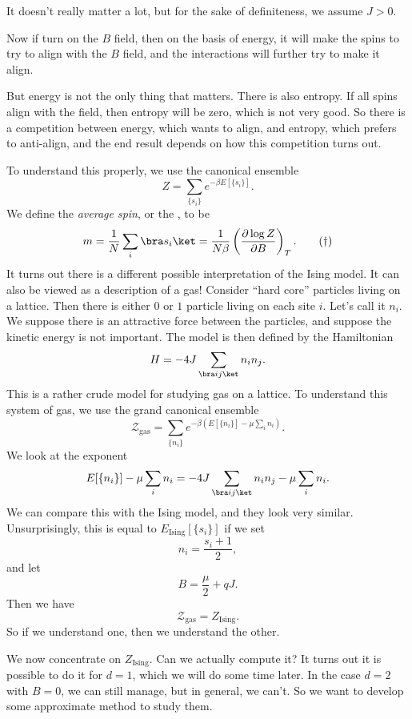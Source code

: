 \documentclass[a4paper]{article}
\begin{document}
It doesn't really matter a lot, but for the sake of definiteness, we assume $J > 0$.

Now if turn on the $B$ field, then on the basis of energy, it will make the spins to try to align with the $B$ field, and the interactions will further try to make it align.

But energy is not the only thing that matters. There is also entropy. If all spins align with the field, then entropy will be zero, which is not very good. So there is a competition between energy, which wants to align, and entropy, which prefers to anti-align, and the end result depends on how this competition turns out.

To understand this properly, we use the canonical ensemble
\[
  Z = \sum_{\{s_i\}} e^{-\beta E[\{s_i\}]}.
\]
We define the \emph{average spin}, or the , to be
\[
  m = \frac{1}{N} \sum_i \bra s_i\ket = \frac{1}{N\beta} \left(\frac{\partial \log Z}{\partial B}\right)_T.\tag{$\dagger$}
\]
It turns out there is a different possible interpretation of the Ising model. It can also be viewed as a description of a gas! Consider ``hard core'' particles living on a lattice. Then there is either $0$ or $1$ particle living on each site $i$. Let's call it $n_i$. We suppose there is an attractive force between the particles, and suppose the kinetic energy is not important. The model is then defined by the Hamiltonian
\[
  H = - 4J \sum_{\bra ij\ket} n_i n_j.
\]
This is a rather crude model for studying gas on a lattice. To understand this system of gas, we use the grand canonical ensemble
\[
  \mathcal{Z}_{\mathrm{gas}} = \sum_{\{n_i\}} e^{-\beta (E [\{n_i\}] - \mu \sum_i n_i)}.
\]
We look at the exponent
\[
  E[\{n_i\}] - \mu \sum_i n_i = -4J \sum_{\bra ij\ket }n_i n_j - \mu \sum_i n_i.
\]
We can compare this with the Ising model, and they look very similar. Unsurprisingly, this is equal to $E_{\mathrm{Ising}} [\{s_i\}]$ if we set
\[
  n_i = \frac{s_i + 1}{2},
\]
and let
\[
  B = \frac{\mu}{2} + qJ.
\]
Then we have
\[
  \mathcal{Z}_{\mathrm{gas}} = Z_{\mathrm{Ising}}.
\]
So if we understand one, then we understand the other.

We now concentrate on $Z_{\mathrm{Ising}}$. Can we actually compute it? It turns out it is possible to do it for $d = 1$, which we will do some time later. In the case $d = 2$ with $B = 0$, we can still manage, but in general, we can't. So we want to develop some approximate method to study them.
\end{document}
